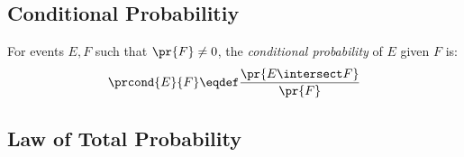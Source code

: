 \documentclass[handout]{mcs}
\begin{document}
{\iffalse
\subsection{Probability Spaces}

  A countable \term{sample space}, $\sspace$, is a nonempty countable set.
  An element $w \in \sspace$ is called an \term{outcome}.  A subset of
  $\sspace$ is called an \term{event}.

  A \term{probability space} consists of a sample
  space, $\sspace$, and a function $\pr{}: \sspace\to [0,1]$, called
  the \term{probability function}, such that
\[
\sum_{w \in \sspace} \pr{w} = 1.
\]

For any event, $E \subseteq \sspace$, the \term{probability of $E$} is
defined to be the sum of the probabilities of the outcomes in $E$:
\[
\pr{E} \eqdef \sum_{w \in E} \pr{w}.
\]


\subsection{Sum Rule \& Union Bound}

Let $E_0,E_1,\dots$ be a (possibly infinite) sequence of events.  These
events are said to be \emph{pairwise disjoint} iff no outcome is in more
than one of these events ---formally: $E_i \intersect E_j = \emptyset$
whenever $i \neq j$.

If these events are pairwise disjoint, then
\begin{equation}
\pr{\lgunion_{n \geq 0} E_n} = \sum_{n \geq 0} \pr{E_n}.\tag{Disjoint Sum Rule}
\end{equation}

Even if they are not pairwise disjoint,
\begin{equation}
\pr{\lgunion_{n \geq 0} E_n} \leq \sum_{i \geq n} \pr{E_n}.\tag{Union Bound}
\end{equation}

\fi

\subsection*{Conditional Probabilitiy}
For events $E,F$ such that $\pr{F} \neq 0$, the \emph{conditional
    probability} of $E$ given $F$ is:
\[
\prcond{E}{F} \eqdef \frac{\pr{E \intersect F}}{\pr{F}}
\]

\subsection*{Law of Total Probability}

}
\end{document}
